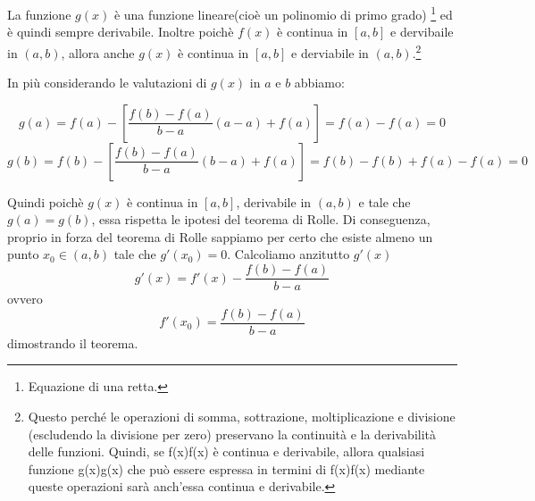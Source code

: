 \documentclass{article}
\begin{document}
La funzione $g(x)$ è una funzione lineare(cioè un polinomio di primo grado) \footnote{Equazione di una retta.} ed è quindi sempre derivabile.
Inoltre poichè $f(x)$ è continua in $[a,b]$ e dervibaile in $(a,b)$, allora anche $g(x)$ è continua in $[a,b]$ e derviabile in $(a,b)$.\footnote{Questo perché le operazioni di somma, sottrazione, moltiplicazione e divisione (escludendo la divisione per zero) preservano la continuità e la derivabilità delle funzioni. Quindi, se f(x)f(x) è continua e derivabile, allora qualsiasi funzione g(x)g(x) che può essere espressa in termini di f(x)f(x) mediante queste operazioni sarà anch'essa continua e derivabile.}

In più considerando le valutazioni di $g(x)$ in $a$ e $b$ abbiamo:

$$g(a)=f(a)-\left[\dfrac{f(b)-f(a)}{b-a} (a-a)+f(a)\right]= f(a)-f(a) = 0$$
$$g(b)=f(b)-\left[\dfrac{f(b)-f(a)}{b-a} (b-a)+f(a) \right]=f(b)-f(b)+f(a)-f(a)=0$$

Quindi poichè $g(x)$ è continua in $[a,b]$, derivabile in $(a,b)$ e tale che $g(a)=g(b)$, essa rispetta le ipotesi del teorema di Rolle.
Di conseguenza, proprio in forza del teorema di Rolle sappiamo per certo che esiste almeno un punto $x_0 \in (a,b)$ tale che $g'(x_0)=0$.
Calcoliamo anzitutto $g'(x)$
$$g'(x)=f'(x)- \dfrac{f(b)-f(a)}{b-a}$$ ovvero
$$f'(x_0) =\dfrac{f(b)-f(a)}{b-a}$$ dimostrando il teorema.
\end{document}
